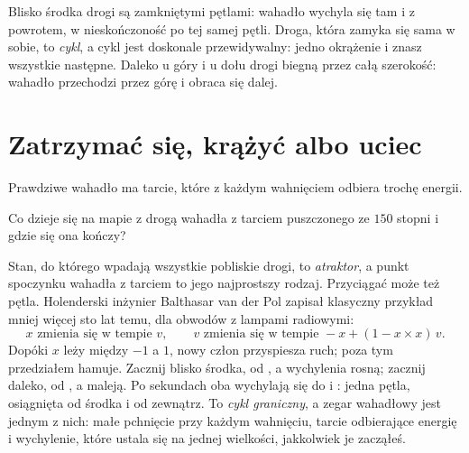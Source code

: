 \noindent
Blisko środka drogi są zamkniętymi pętlami: wahadło wychyla się tam i z
powrotem, w nieskończoność po tej samej pętli. Droga, która zamyka się sama w
sobie, to \emph{cykl}, a cykl jest doskonale przewidywalny: jedno okrążenie i
znasz wszystkie następne. Daleko u góry i u dołu drogi biegną przez całą
szerokość: wahadło przechodzi przez górę i obraca się dalej.

\section{Zatrzymać się, krążyć albo uciec}
\label{sec:ch04-settle}

\noindent
Prawdziwe wahadło ma tarcie, które z każdym wahnięciem odbiera trochę
energii.

\begin{think}
Co dzieje się na mapie z drogą wahadła z tarciem puszczonego ze $150$
stopni i gdzie się ona kończy?
\end{think}
Stan, do którego wpadają wszystkie pobliskie drogi, to \emph{atraktor}, a
punkt spoczynku wahadła z tarciem to jego najprostszy rodzaj. Przyciągać może
też pętla. Holenderski inżynier Balthasar van der Pol zapisał klasyczny
przykład mniej więcej sto lat temu, dla obwodów z lampami radiowymi:
\[ x \text{ zmienia się w tempie } v, \qquad
   v \text{ zmienia się w tempie } -x + (1 - x \times x)\, v. \]
Dopóki $x$ leży między $-1$ a $1$, nowy człon przyspiesza ruch; poza tym
przedziałem hamuje. Zacznij blisko środka, od , a
wychylenia rosną; zacznij daleko, od , a maleją. Po
 sekundach oba wychylają się do  i
: jedna pętla, osiągnięta od środka i od zewnątrz.
To \emph{cykl graniczny}, a zegar wahadłowy jest jednym z nich: małe
pchnięcie przy każdym wahnięciu, tarcie odbierające energię i wychylenie,
które ustala się na jednej wielkości, jakkolwiek je zacząłeś.


